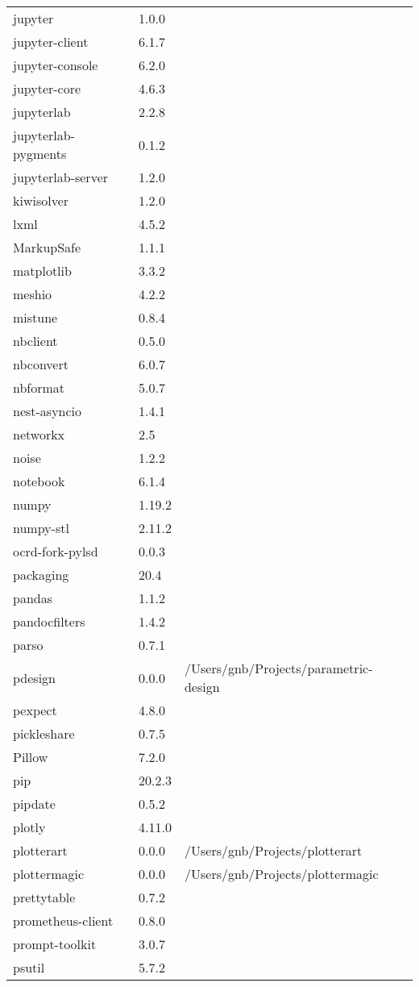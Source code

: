 \begin{longtable}{|l|l|l|}
jupyter & 1.0.0 & \\
jupyter-client & 6.1.7 & \\
jupyter-console & 6.2.0 & \\
jupyter-core & 4.6.3 & \\
jupyterlab & 2.2.8 & \\
jupyterlab-pygments & 0.1.2 & \\
jupyterlab-server & 1.2.0 & \\
kiwisolver & 1.2.0 & \\
lxml & 4.5.2 & \\
MarkupSafe & 1.1.1 & \\
matplotlib & 3.3.2 & \\
meshio & 4.2.2 & \\
mistune & 0.8.4 & \\
nbclient & 0.5.0 & \\
nbconvert & 6.0.7 & \\
nbformat & 5.0.7 & \\
nest-asyncio & 1.4.1 & \\
networkx & 2.5 & \\
noise & 1.2.2 & \\
notebook & 6.1.4 & \\
numpy & 1.19.2 & \\
numpy-stl & 2.11.2 & \\
ocrd-fork-pylsd & 0.0.3 & \\
packaging & 20.4 & \\
pandas & 1.1.2 & \\
pandocfilters & 1.4.2 & \\
parso & 0.7.1 & \\
pdesign & 0.0.0 & /Users/gnb/Projects/parametric-design \\
pexpect & 4.8.0 & \\
pickleshare & 0.7.5 & \\
Pillow & 7.2.0 & \\
pip & 20.2.3 & \\
pipdate & 0.5.2 & \\
plotly & 4.11.0 & \\
plotterart & 0.0.0 & /Users/gnb/Projects/plotterart \\
plottermagic & 0.0.0 & /Users/gnb/Projects/plottermagic \\
prettytable & 0.7.2 & \\
prometheus-client & 0.8.0 & \\
prompt-toolkit & 3.0.7 & \\
psutil & 5.7.2 & \\

\end{longtable}
